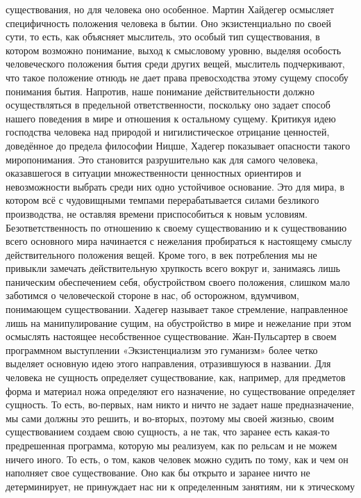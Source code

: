 существования, но для человека оно особенное. Мартин Хайдегер осмысляет
специфичность положения человека в бытии. Оно экзистенциально по своей сути, то
есть, как объясняет мыслитель, это особый тип существования, в котором возможно
понимание, выход к смысловому уровню, выделяя особость человеческого положения
бытия среди других вещей, мыслитель подчеркивают, что такое положение отнюдь не
дает права превосходства этому сущему способу понимания бытия. Напротив, наше
понимание действительности должно осуществляться в предельной ответственности,
поскольку оно задает способ нашего поведения в мире и отношения к остальному
сущему. Критикуя идею господства человека над природой и нигилистическое
отрицание ценностей, доведённое до предела философии Ницше, Хадегер показывает
опасности такого миропонимания. Это становится разрушительно как для самого
человека, оказавшегося в ситуации множественности ценностных ориентиров и
невозможности выбрать среди них одно устойчивое основание. Это для мира, в
котором всё с чудовищными темпами перерабатывается силами безликого
производства, не оставляя времени приспособиться к новым условиям.
Безответственность по отношению к своему существованию и к существованию всего
основного мира начинается с нежелания пробираться к настоящему смыслу
действительного положения вещей. Кроме того, в век потребления мы не привыкли
замечать действительную хрупкость всего вокруг и, занимаясь лишь паническим
обеспечением себя, обустройством своего положения, слишком мало заботимся о
человеческой стороне в нас, об осторожном, вдумчивом, понимающем существовании.
Хадегер называет такое стремление, направленное лишь на манипулирование сущим,
на обустройство в мире и нежелание при этом осмыслять настоящее несобственное
существование. Жан-Пульсартер в своем программном выступлении «Экзистенциализм
это гуманизм» более четко выделяет основную идею этого направления, отразившуюся
в названии. Для человека не сущность определяет существование, как, например,
для предметов форма и материал ножа определяют его назначение, но существование
определяет сущность. То есть, во-первых, нам никто и ничто не задает наше
предназначение, мы сами должны это решить, и во-вторых, поэтому мы своей жизнью,
своим существованием создаем свою сущность, а не так, что заранее есть какая-то
предрешенная программа, которую мы реализуем, как по рельсам и не можем ничего
иного. То есть, о том, каков человек можно судить по тому, как и чем он
наполняет свое существование. Оно как бы открыто и заранее ничто не
детерминирует, не принуждает нас ни к определенным занятиям, ни к этическому
